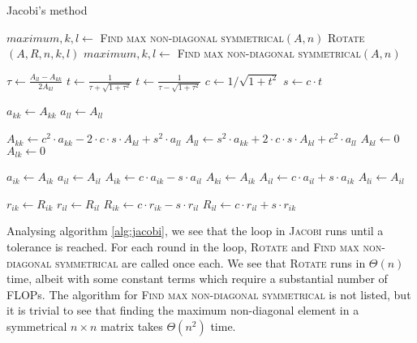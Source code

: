 \documentclass[a4paper]{article}
\begin{document}
\begin{algorithm}
\caption{Jacobi's method} \label{alg:jacobi}
\begin{algorithmic}[1]
  \Statex {}
  \State $maximum, k, l \gets$ \textsc{Find max non-diagonal symmetrical}$(A,n)$
    \State \textsc{Rotate}$(A, R, n, k, l)$
    \State $maximum, k, l \gets$ \textsc{Find max non-diagonal symmetrical}$(A,n)$
  \EndWhile
  \EndProcedure

  \Statex %



  \State $\tau \gets \frac{A_{ll} - A_{kk}}{2A_{kl}}$
      \State $t \gets \frac{1}{\tau + \sqrt{1 + \tau^{2}}}$
  \Else
      \State $t \gets \frac{1}{\tau - \sqrt{1 + \tau^{2}}}$
  \EndIf
  \State $c \gets 1 / \sqrt{1+t^{2}}$
  \State $s \gets c \cdot t$

  \State $a_{kk} \gets A_{kk}$
  \State $a_{ll} \gets A_{ll}$

  \State $A_{kk} \gets c^{2} \cdot a_{kk} - 2 \cdot c \cdot s \cdot A_{kl} + s^{2} \cdot a_{ll}$
  \State $A_{ll} \gets s^{2} \cdot a_{kk} + 2 \cdot c \cdot s \cdot A_{kl} + c^{2} \cdot a_{ll}$
  \State $A_{kl} \gets 0$
  \State $A_{lk} \gets 0$

          \State $a_{ik} \gets A_{ik}$
          \State $a_{il} \gets A_{il}$
          \State $A_{ik} \gets c \cdot a_{ik} - s \cdot a_{il}$
          \State $A_{ki} \gets A_{ik}$
          \State $A_{il} \gets c \cdot a_{il} + s \cdot a_{ik}$
          \State $A_{li} \gets A_{il}$
      \EndIf

        \State $r_{ik} \gets R_{ik}$
        \State $r_{il} \gets R_{il}$
        \State $R_{ik} \gets c \cdot r_{ik} - s \cdot r_{il}$
        \State $R_{il} \gets c \cdot r_{il} + s \cdot r_{ik}$
    \EndFor


  \EndProcedure
\end{algorithmic}
\end{algorithm}

Analysing algorithm \ref{alg:jacobi}, we see that the loop in \textsc{Jacobi} runs until a tolerance is reached. For each round in the loop, \textsc{Rotate} and \textsc{Find max non-diagonal symmetrical} are called once each. We see that \textsc{Rotate} runs in $\Theta(n)$ time, albeit with some constant terms which require a substantial number of FLOPs. The algorithm for \textsc{Find max non-diagonal symmetrical} is not listed, but it is trivial to see that finding the maximum non-diagonal element in a symmetrical $n \times n$ matrix takes $\Theta(n^2)$ time.
\end{document}
